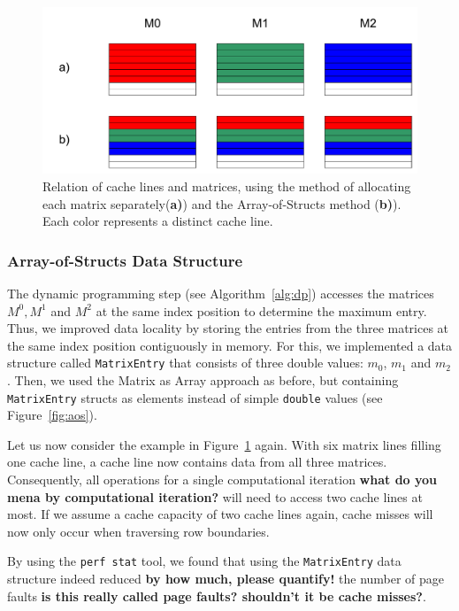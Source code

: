 \documentclass[runningheads,a4paper]{llncs}
\begin{document}
\begin{figure}
\centering
\includegraphics[width=\textwidth]{images/cachelines.pdf}
\caption{Relation of cache lines and matrices, using the method of allocating each matrix separately(\textbf{a)}) and the Array-of-Structs method (\textbf{b)}). 
Each color represents a distinct cache line.}
\label{fig:cachelines}
\end{figure}

\subsubsection{Array-of-Structs Data Structure}
The dynamic programming step (see Algorithm~\ref{alg:dp}) accesses the matrices $M^0, M^1$ and $M^2$ at the same index position to determine the maximum entry. 
Thus, we improved data locality by storing the entries from the three matrices at the same index position contiguously in memory. 
For this, we implemented a data structure called \texttt{MatrixEntry} that consists of three double values: \texttt{$m_0$}, \texttt{$m_1$} and \texttt{$m_2$}. 
Then, we used the Matrix as Array approach as before, but containing \texttt{MatrixEntry} structs as elements instead of simple 
\texttt{double} values (see Figure~\ref{fig:aos}). 

Let us now consider the example in Figure~\ref{fig:cachelines} again. 
With six matrix lines filling one cache line, a cache line now contains data from all three matrices. 
Consequently, all operations for a single computational iteration {\bf what do you mena by computational iteration?} 
will need to access two cache lines at most. 
If we assume a cache capacity of two cache lines again, cache misses will now only occur when traversing row boundaries.

By using the \texttt{perf stat} tool, we found that using the \texttt{MatrixEntry} data structure indeed reduced {\bf by how much, please quantify!} 
the number of page faults {\bf is this really called page faults? shouldn't it be cache misses?}.
\end{document}
